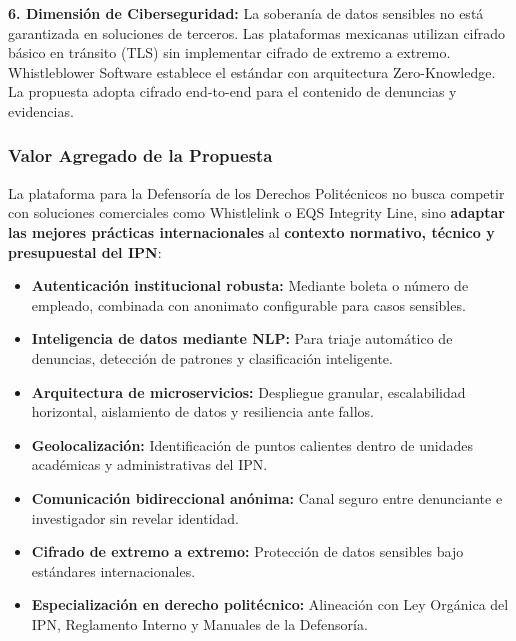 \begin{flushleft}
\textbf{6. Dimensión de Ciberseguridad:} La soberanía de datos sensibles no está garantizada en soluciones de terceros. Las plataformas mexicanas utilizan cifrado básico en tránsito (TLS) sin implementar cifrado de extremo a extremo. Whistleblower Software establece el estándar con arquitectura Zero-Knowledge. La propuesta adopta cifrado end-to-end para el contenido de denuncias y evidencias.

\subsubsection*{Valor Agregado de la Propuesta}

La plataforma para la Defensoría de los Derechos Politécnicos no busca competir con soluciones comerciales como Whistlelink o EQS Integrity Line, sino \textbf{adaptar las mejores prácticas internacionales} al \textbf{contexto normativo, técnico y presupuestal del IPN}:

\begin{itemize}
    \item \textbf{Autenticación institucional robusta:} Mediante boleta o número de empleado, combinada con anonimato configurable para casos sensibles.
    
    \item \textbf{Inteligencia de datos mediante NLP:} Para triaje automático de denuncias, detección de patrones y clasificación inteligente.
    
    \item \textbf{Arquitectura de microservicios:} Despliegue granular, escalabilidad horizontal, aislamiento de datos y resiliencia ante fallos.
    
    \item \textbf{Geolocalización:} Identificación de puntos calientes dentro de unidades académicas y administrativas del IPN.
    
    \item \textbf{Comunicación bidireccional anónima:} Canal seguro entre denunciante e investigador sin revelar identidad.
    
    \item \textbf{Cifrado de extremo a extremo:} Protección de datos sensibles bajo estándares internacionales.
    
    \item \textbf{Especialización en derecho politécnico:} Alineación con Ley Orgánica del IPN, Reglamento Interno y Manuales de la Defensoría.
\end{itemize}

\end{flushleft}